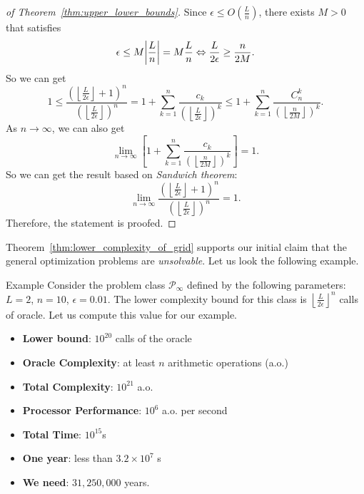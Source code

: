 \begin{proof}[of Theorem~\ref{thm:upper_lower_bounds}]
    Since \(\epsilon \le O\left( \frac{L}{n} \right)\), there exists \(M > 0\) that satisfies
    \[
        \epsilon \le M \abs{\frac{L}{n}} = M \frac{L}{n} \Leftrightarrow \frac{L}{2\epsilon} \ge \frac{n}{2M}.
    \]
    So we can get
    \[
        1 \le \frac{\left(\left\lfloor \frac{L}{2\epsilon} \right\rfloor + 1\right)^n}{\left(\left\lfloor \frac{L}{2\epsilon} \right\rfloor\right)^n} 
        = 1 + \sum_{k=1}^n\frac{c_k}{\left(\left\lfloor \frac{L}{2\epsilon} \right\rfloor\right)^k} 
        \le 1 + \sum_{k=1}^n\frac{C_n^k}{\left(\left\lfloor \frac{n}{2M} \right\rfloor\right)^k}.
    \]
    As \(n \to \infty\), we can also get
    \[
        \lim_{n\to\infty}\left[1 + \sum_{k=1}^n\frac{c_k}{\left(\left\lfloor \frac{n}{2M} \right\rfloor\right)^k}\right] = 1.
    \]
    So we can get the result based on \emph{Sandwich theorem}:
    \[
        \lim_{n \to \infty} \frac{\left(\left\lfloor \frac{L}{2\epsilon} \right\rfloor + 1\right)^n}{\left(\left\lfloor \frac{L}{2\epsilon} \right\rfloor\right)^n} = 1.
    \]
    Therefore, the statement is proofed.
\end{proof}

Theorem~\ref{thm:lower_complexity_of_grid} supports our initial claim that the general optimization problems are \emph{unsolvable}. Let us look the following example.

\begin{colorboxnote}{Example}
    Consider the problem class \(\mathscr{P}_\infty\) defined by the following parameters: \(L = 2\), \(n = 10\), \(\epsilon = 0.01\).
    The lower complexity bound for this class is \(\left\lfloor \frac{L}{2\epsilon} \right\rfloor^n\) calls of oracle. Let us compute this value for our example.
    \begin{itemize}
        \item \textbf{Lower bound}: \(10^{20}\) calls of the oracle
        \item \textbf{Oracle Complexity}: at least \(n\) arithmetic operations (a.o.)
        \item \textbf{Total Complexity}: \(10^{21}\) a.o.
        \item \textbf{Processor Performance}: \(10^6\) a.o. per second
        \item \textbf{Total Time}: \(10^{15}\)s
        \item \textbf{One year}: less than \(3.2\times 10^7\) s
        \item \textbf{We need}: \(31,250,000\) years.
    \end{itemize}
\end{colorboxnote}

